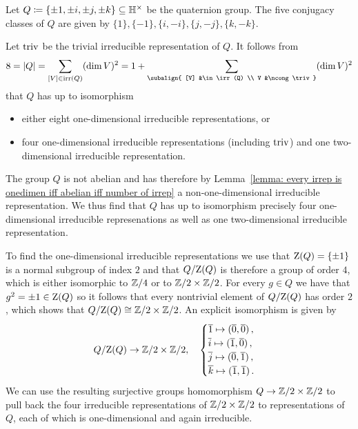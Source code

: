 \begin{example}
  Let $Q \coloneqq \{ \pm 1, \pm i, \pm j, \pm k \} \subseteq \mathbb{H}^\times$ be the quaternion group.
  The five conjugacy classes of $Q$ are given by $\{1\}, \{-1\}, \{i, -i\}, \{j, -j\}, \{k, -k\}$.
  
  Let $\operatorname{triv}$ be the trivial irreducible representation of $Q$.
  It follows from
  \[
      8
    = |Q|
    = \sum_{[V] \in \irr(Q)} (\dim V)^2
    = 1 + \sum_{\subalign{ [V] &\in \irr(Q) \\ V &\ncong \triv }} (\dim V)^2
  \]
  that $Q$ has up to isomorphism
  \begin{itemize}
    \item
      either eight one-dimensional irreducible representations, or
    \item
      four one-dimensional irreducible representations (including $\operatorname{triv}$) and one two-di\-men\-sion\-al irreducible  representation.
  \end{itemize}
  The group $Q$ is not abelian and has therefore by Lemma~\ref{lemma: every irrep is onedimen iff abelian iff number of irrep} a non-one-dimensional irreducible representation.
  We thus find that $Q$ has up to isomorphism precisely four one-dimensional irreducible represenations as well as one two-dimensional irreducible representation.
  
  To find the one-dimensional irreducible representations we use that $\operatorname{Z}(Q) = \{\pm 1\}$ is a normal subgroup of index $2$ and that $Q/{\operatorname{Z}(Q)}$ is therefore a group of order $4$, which is either isomorphic to $\mathbb{Z}/4$ or to $\mathbb{Z}/2 \times \mathbb{Z}/2$.
  For every $g \in Q$ we have that $g^2 = \pm 1 \in \operatorname{Z}(Q)$ so it follows that every nontrivial element of $Q/{\operatorname{Z}(Q)}$ has order $2$, which shows that $Q/{\operatorname{Z}(Q)} \cong \mathbb{Z}/2 \times \mathbb{Z}/2$.
  An explicit isomorphism is given by
  \[
            Q/{\operatorname{Z}(Q)}
    \to     \mathbb{Z}/2 \times \mathbb{Z}/2,
    \quad   \begin{cases}
              \overline{1} \mapsto (\overline{0}, \overline{0}) \,,  \\
              \overline{i} \mapsto (\overline{1}, \overline{0}) \,,  \\
              \overline{j} \mapsto (\overline{0}, \overline{1}) \,,  \\
              \overline{k} \mapsto (\overline{1}, \overline{1}) \,.
            \end{cases}
  \]
  We can use the resulting surjective groups homomorphism $Q \to \mathbb{Z}/2 \times \mathbb{Z}/2$ to pull back the four irreducible representations of $\mathbb{Z}/2 \times \mathbb{Z}/2$ to representations of $Q$, each of which is one-dimensional and again irreducible.
  

\end{example}
